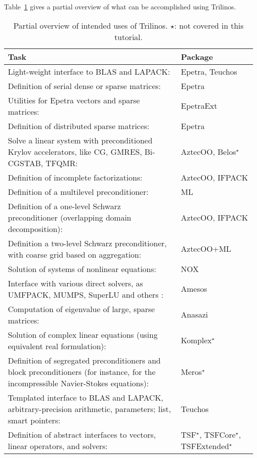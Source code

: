 Table~\ref{tab:tripackages} gives a partial overview of what can be
accomplished using Trilinos.
\begin{table}[htbp]
  \centering
  \begin{tabular}{| p{10cm} | p{3cm} |}
    \hline
    {\bf Task} & {\bf Package} \\
    \hline
    Light-weight interface to BLAS and LAPACK: & Epetra, Teuchos \\\hline
    Definition of serial dense or sparse matrices: & Epetra \\\hline
    Utilities for Epetra vectors and sparse matrices: & EpetraExt \\\hline
    Definition of distributed sparse matrices:& Epetra \\\hline
    Solve a linear system with preconditioned Krylov accelerators, like
    CG, GMRES, Bi-CGSTAB, TFQMR:& AztecOO, Belos$^\star$ \\\hline
    Definition of incomplete factorizations:& AztecOO, \newline IFPACK \\\hline
    Definition of a multilevel preconditioner:& ML \\\hline
    Definition of a one-level Schwarz preconditioner (overlapping domain
    decomposition):& AztecOO, \newline IFPACK \\\hline
    Definition a two-level Schwarz preconditioner, with coarse grid based on
    aggregation:& AztecOO+ML \\\hline
    Solution of  systems of nonlinear equations:& NOX \\\hline
    Interface with various direct solvers, as UMFPACK, MUMPS, SuperLU
    and others :& Amesos \\\hline
    Computation of eigenvalue of large, sparse matrices:& Anasazi
    \\\hline
    Solution of complex linear equations (using equivalent real formulation):&
    Komplex$^\star$ \\\hline
    Definition of segregated preconditioners and block preconditioners (for
    instance, for the incompressible Navier-Stokes equations):&
    Meros$^\star$ \\\hline
    Templated interface to BLAS and LAPACK, arbitrary-precision
    arithmetic, parameters; list, smart pointers:& Teuchos \\\hline
    Definition of abstract interfaces to vectors, linear operators, and solvers:& TSF$^\star$, TSFCore$^\star$, TSFExtended$^\star$    \\
    \hline
  \end{tabular}
  \caption{Partial overview of intended uses of  Trilinos. $\star$:
    not covered in this tutorial.}
  \label{tab:tripackages}
\end{table}

